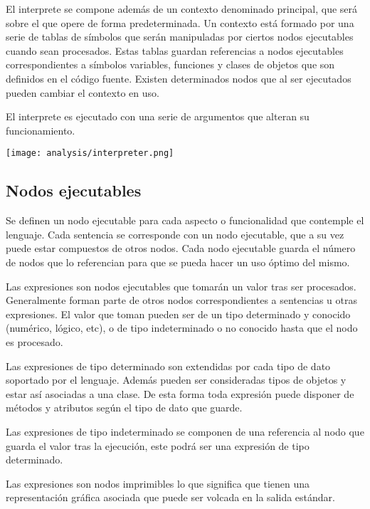 El interprete se compone además de un contexto denominado principal, que será sobre el que 
opere de forma predeterminada. Un contexto está formado por una serie de tablas de símbolos 
que serán manipuladas por ciertos nodos ejecutables cuando sean procesados. Estas tablas guardan 
referencias a nodos ejecutables correspondientes a símbolos variables, funciones y clases de objetos 
que son definidos en el código fuente. Existen determinados nodos que al ser ejecutados pueden 
cambiar el contexto en uso.

El interprete es ejecutado con una serie de argumentos que alteran su funcionamiento.

\begin{center}
\texttt{[image: analysis/interpreter.png]}
\end{center}
\subsection{Nodos ejecutables}
Se definen un nodo ejecutable para cada aspecto o funcionalidad que contemple el lenguaje.
Cada sentencia se corresponde con un nodo ejecutable, que a su vez puede estar compuestos de otros
nodos. Cada nodo ejecutable guarda el número de nodos que lo referencian para que se pueda hacer un uso 
óptimo del mismo.

Las expresiones son nodos ejecutables que tomarán un valor tras ser procesados. Generalmente forman parte de otros 
nodos correspondientes a sentencias u otras expresiones. El valor que toman pueden ser de un tipo determinado y conocido (numérico, lógico, etc), 
o de tipo indeterminado o no conocido hasta que el nodo es procesado. 

Las expresiones de tipo determinado son extendidas por cada tipo de dato soportado por el lenguaje. Además 
pueden ser consideradas tipos de objetos y estar así asociadas a una clase. De esta forma toda expresión puede disponer
de métodos y atributos según el tipo de dato que guarde.

Las expresiones de tipo indeterminado se componen de una referencia al nodo que guarda el valor tras la ejecución, este podrá ser una 
expresión de tipo determinado.

Las expresiones son nodos imprimibles lo que significa que tienen una representación gráfica asociada que puede ser volcada en la
salida estándar.

